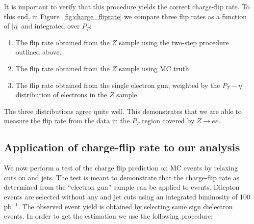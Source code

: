 It is important to verify that this procedure yields the correct 
charge-flip rate.  To this end, in Figure~\ref{fig:charge_fliprate}
we compare three flip rates as a function of $|\eta|$ and integrated
over $P_T$:
\begin{enumerate}
\item The flip rate obtained from the $Z$ sample using the two-step
procedure outlined above.
\item The flip rate obtained from the $Z$ sample using MC truth.
\item The flip rate obtained from the single electron gun, weighted by the
$P_T-\eta$ distribution of electrons in the $Z$ sample.
\end{enumerate}
The three distributions agree quite well. This demonstrates that 
we are able to measure the flip rate from the data in the $P_T$
region covered by $Z \to ee$. 


\subsection{Application of charge-flip rate to our analysis}

We now perform a test of the charge flip prediction on \ttbar MC events by relaxing cuts on \met and jets. The test is meant
to demonstrate that the charge-flip rate as determined from the ``electron gun'' sample can be applied
to \ttbar events. Dilepton events are selected without any \met and jet cuts using an integrated 
luminosity of 100 pb$^{-1}$. The observed event yield is obtained by selecting same sign dielectron events.
In order to get the estimation we use the following procedure:

